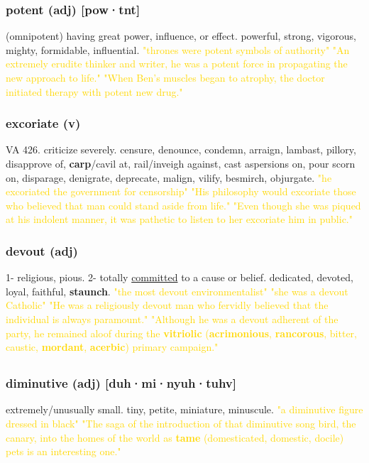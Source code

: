 \documentclass{proc}
\begin{document}
	\subsubsection{\textcolor{brickred}{potent} (adj) [pow·tnt]}
	(omnipotent) having great power, influence, or effect. powerful, strong, vigorous, mighty, formidable, influential.
	\textcolor{gold}{"thrones were potent symbols of authority" "An extremely erudite thinker and writer, he was a potent force in  propagating the new approach to  life." "When Ben's muscles began to atrophy, the doctor initiated therapy with  potent new drug."}
	
	\subsubsection{\textcolor{brickred}{excoriate} (v)}
	VA 426. criticize severely. censure, denounce, condemn, arraign, lambast, pillory, disapprove of, \textbf{carp}/cavil at, rail/inveigh against, cast aspersions on, pour scorn on, disparage, denigrate, deprecate, malign, vilify, besmirch, objurgate.
	\textcolor{gold}{"he excoriated the government for censorship" "His philosophy would excoriate those who believed that man could stand aside from life." "Even though she was piqued at his indolent manner, it was pathetic to listen to her excoriate him in public."}
	
	\subsubsection{\textcolor{brickred}{devout} (adj)}
	1- religious, pious. 2- totally \underline{committed} to a cause or belief. dedicated, devoted, loyal, faithful, \textbf{staunch}.
	\textcolor{gold}{"the most devout environmentalist" "she was a devout Catholic" "He was a religiously devout man who fervidly believed that the individual is always paramount." "Although he was a devout adherent of the party, he remained aloof during the \textbf{vitriolic} (\textbf{acrimonious}, \textbf{rancorous}, bitter, caustic, \textbf{mordant}, \textbf{acerbic}) primary campaign."}
	
	\newpage
	\subsection{}
	\subsubsection{\textcolor{brickred}{diminutive} (adj) [duh·mi·nyuh·tuhv]}
	extremely/unusually small. tiny, petite, miniature, minuscule.
	\textcolor{gold}{"a diminutive figure dressed in black" "The saga of the introduction of that diminutive song bird, the canary, into the homes of the world as \textbf{tame} (domesticated, domestic, docile) pets is an interesting one."}
	
\end{document}

